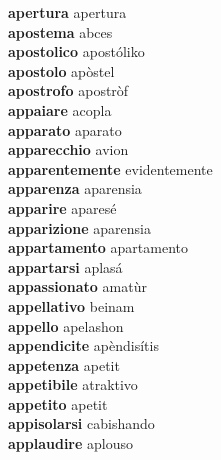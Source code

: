 \textbf{apertura } apertura \\
\textbf{apostema } abces \\
\textbf{apostolico } apostóliko \\
\textbf{apostolo } apòstel \\
\textbf{apostrofo } apostròf \\
\textbf{appaiare } acopla \\
\textbf{apparato } aparato \\
\textbf{apparecchio } avion \\
\textbf{apparentemente } evidentemente \\
\textbf{apparenza } aparensia \\
\textbf{apparire } aparesé \\
\textbf{apparizione } aparensia \\
\textbf{appartamento } apartamento \\
\textbf{appartarsi } aplasá \\
\textbf{appassionato } amatùr \\
\textbf{appellativo } beinam \\
\textbf{appello } apelashon \\
\textbf{appendicite } apèndisítis \\
\textbf{appetenza } apetit \\
\textbf{appetibile } atraktivo \\
\textbf{appetito } apetit \\
\textbf{appisolarsi } cabishando \\
\textbf{applaudire } aplouso \\
